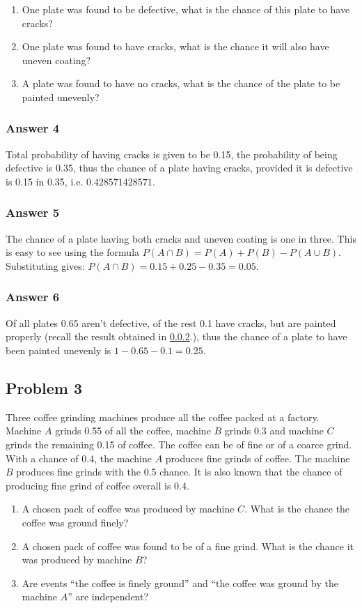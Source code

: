 \documentclass[11pt]{article}
\begin{document}
\begin{enumerate}
\item One plate was found to be defective, what is the chance of this plate
to have cracks?
\item One plate was found to have cracks, what is the chance it will also
have uneven coating?
\item A plate was found to have no cracks, what is the chance of the plate
to be painted unevenly?
\end{enumerate}

\subsubsection{Answer 4}
\label{sec-1-2-1}
Total probability of having cracks is given to be 0.15, the probability of
being defective is 0.35, thus the chance of a plate having cracks, provided
it is defective is 0.15 in 0.35, i.e. $\num{0.428571428571}$.
\subsubsection{Answer 5}
\label{sec-1-2-2}
The chance of a plate having both cracks and uneven coating is one in three.
This is easy to see using the formula $P(A \cap B) = P(A) + P(B) - P(A \cup B)$.
Substituting gives: $P(A \cap B) = 0.15 + 0.25 - 0.35 = 0.05$.
\subsubsection{Answer 6}
\label{sec-1-2-3}
Of all plates 0.65 aren't defective, of the rest 0.1 have cracks, but are
painted properly (recall the result obtained in \ref{sec-1-2-2}.), thus the chance
of a plate to have been painted unevenly is $1 - 0.65 - 0.1 = 0.25$.
\subsection{Problem 3}
\label{sec-1-3}
Three coffee grinding machines produce all the coffee packed at a factory.
Machine $A$ grinds 0.55 of all the coffee, machine $B$ grinds 0.3 and machine
$C$ grinds the remaining 0.15 of coffee.  The coffee can be of fine or of a
coarce grind.  With a chance of 0.4, the machine $A$ produces fine grinds of
coffee.  The machine $B$ produces fine grinds with the 0.5 chance.
It is also known that the chance of producing fine grind of coffee overall
is 0.4.

\begin{enumerate}
\item A chosen pack of coffee was produced by machine $C$.  What is the chance
the coffee was ground finely?
\item A chosen pack of coffee was found to be of a fine grind.  What is the
chance it was produced by machine $B$?
\item Are events ``the coffee is finely ground'' and ``the coffee was ground
by the machine $A$'' are independent?
\end{enumerate}
\end{document}
